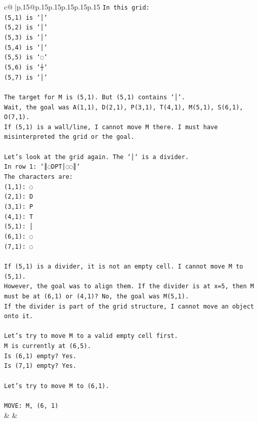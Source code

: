 \documentclass{article}
\begin{document}
{\begin{supertabular}{c@{$\;$}|p{.15\linewidth}@{}p{.15\linewidth}p{.15\linewidth}p{.15\linewidth}p{.15\linewidth}p{.15\linewidth}}
{{{\texttt{In this grid:} \\
\texttt{(5,1) is `│`} \\
\texttt{(5,2) is `│`} \\
\texttt{(5,3) is `│`} \\
\texttt{(5,4) is `│`} \\
\texttt{(5,5) is `◌`} \\
\texttt{(5,6) is `┼`} \\
\texttt{(5,7) is `│`} \\
\\ 
\texttt{The target for M is (5,1). But (5,1) contains `│`.} \\
\texttt{Wait, the goal was A(1,1), D(2,1), P(3,1), T(4,1), M(5,1), S(6,1), O(7,1).} \\
\texttt{If (5,1) is a wall/line, I cannot move M there. I must have misinterpreted the grid or the goal.} \\
\\ 
\texttt{Let's look at the grid again. The `│` is a divider.} \\
\texttt{In row 1: `║◌DPT│◌◌║`} \\
\texttt{The characters are:} \\
\texttt{(1,1): ◌} \\
\texttt{(2,1): D} \\
\texttt{(3,1): P} \\
\texttt{(4,1): T} \\
\texttt{(5,1): │} \\
\texttt{(6,1): ◌} \\
\texttt{(7,1): ◌} \\
\\ 
\texttt{If (5,1) is a divider, it is not an empty cell. I cannot move M to (5,1).} \\
\texttt{However, the goal was to align them. If the divider is at x=5, then M must be at (6,1) or (4,1)? No, the goal was M(5,1).} \\
\texttt{If the divider is part of the grid structure, I cannot move an object onto it.} \\
\\ 
\texttt{Let's try to move M to a valid empty cell first.} \\
\texttt{M is currently at (6,5).} \\
\texttt{Is (6,1) empty? Yes.} \\
\texttt{Is (7,1) empty? Yes.} \\
\\ 
\texttt{Let's try to move M to (6,1).} \\
\\ 
\texttt{MOVE: M, (6, 1)} \\
            }
        }
    }
    & & \\ \\


\end{supertabular}}
\end{document}
